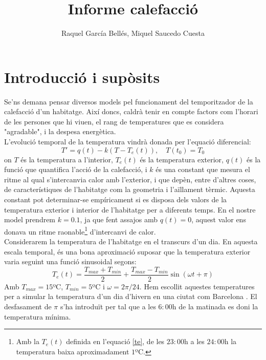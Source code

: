 \documentclass[11pt]{article}
\title{\sffamily {\bfseries EDIM I:} Informe calefacció}
\author{\sffamily Raquel García Bellés, Miquel Saucedo Cuesta}
\date{}
\begin{document}
	
\maketitle
\section*{Introducció i supòsits}
Se'ns demana pensar diversos models pel funcionament del temporitzador de la calefacció d'un habitatge. Així doncs, caldrà tenir en compte factors com l'horari de les persones que hi viuen, el rang de temperatures que es considera "agradable", i la despesa energètica. \\

 

L'evolució temporal de la temperatura vindrà donada per l'equació diferencial:
\begin{equation}\label{principal}
	T'=q(t)-k(T-T_e(t)),\quad T(t_0)=T_0
\end{equation}
on $T$ és la temperatura a l'interior, $T_e(t)$ és la temperatura exterior, $q(t)$ és la funció que quantifica l'acció de la calefacció, i $k$ és una constant que mesura el ritme al qual s'intercanvia calor amb l'exterior, i que depèn, entre d'altres coses, de característiques de l'habitatge com la geometria i l'aïllament tèrmic. Aquesta constant pot determinar-se empíricament si es disposa dels valors de la temperatura exterior i interior de l'habitatge per a diferents temps. En el nostre model prendrem $k=0.1$, ja que fent assajos amb $q(t)=0$, aquest valor ens donava un ritme raonable\footnote{Amb la $T_e(t)$ definida en l'equació \eqref{te}, de les $23:00$h a les $24:00$h la temperatura baixa aproximadament $1$ºC.} d'intercanvi de calor.\\

Considerarem la temperatura de l'habitatge en el transcurs d'un dia. En aquesta escala temporal, és una bona aproximació suposar que la temperatura exterior varia seguint una funció sinusoidal segons:
 \begin{equation}\label{te}
T_e(t)=\frac{T_{max}+T_{min}}{2}+\frac{T_{max}-T_{min}}{2}\sin\left(\omega t+\pi\right)
\end{equation}
Amb $T_{max}=15$ºC, $T_{min}=5$ºC i $\omega=2\pi/24$. Hem escollit aquestes temperatures per a simular la temperatura d'un dia d'hivern en una ciutat com Barcelona \cite{df}. El desfasament de $\pi$ s'ha introduït per tal que a les $6:00$h de la matinada es doni la temperatura mínima.\\
\end{document}
